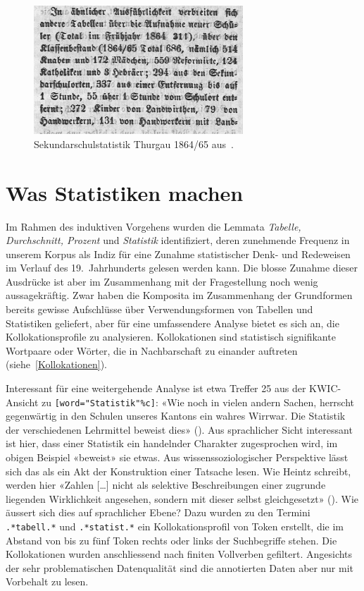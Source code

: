\begin{figure}[!ht]
    \centering
    \includegraphics[width=0.7\textwidth]{Figures/slz-002_1866_011_25_32_e6.jpg}
    \caption{Sekundarschulstatistik Thurgau 1864/65 aus~\cite[24]{noauthor_schulnachrichten_1866}.}
    \label{figure:5-3}
\end{figure}

\section{Was Statistiken machen}\label{chapter5-3}

Im Rahmen des induktiven Vorgehens wurden die Lemmata \textit{Tabelle, Durchschnitt, Prozent} und \textit{Statistik} identifiziert, deren zunehmende Frequenz in unserem Korpus als Indiz für eine Zunahme statistischer Denk- und Redeweisen im Verlauf des 19.~Jahrhunderts gelesen werden kann. Die blosse Zunahme dieser Ausdrücke ist aber im Zusammenhang mit der Fragestellung noch wenig aussagekräftig. Zwar haben die Komposita im Zusammenhang der Grundformen bereits gewisse Aufschlüsse über Verwendungsformen von Tabellen und Statistiken geliefert, aber für eine umfassendere Analyse bietet es sich an, die Kollokationsprofile zu analysieren. Kollokationen sind statistisch signifikante Wortpaare oder Wörter, die in Nachbarschaft zu einander auftreten (siehe~\ref{Kollokationen}).

Interessant für eine weitergehende Analyse ist etwa Treffer 25 aus der KWIC-Ansicht zu \texttt{[word=\-\string"Sta\-ti\-stik"\-\%c]}: «Wie noch in vielen andern Sachen, herrscht gegenwärtig in den Schulen unseres Kantons ein wahres Wirrwar. Die Statistik der verschiedenen Lehrmittel beweist dies» (\cite[14]{noauthor_korrespondenzen_1858}). Aus sprachlicher Sicht interessant ist hier, dass einer Statistik ein handelnder Charakter zugesprochen wird, im obigen Beispiel «beweist» sie etwas. Aus wissenssoziologischer Perspektive lässt sich das als ein Akt der Konstruktion einer Tatsache lesen. Wie Heintz schreibt, werden hier «Zahlen […] nicht als selektive Beschreibungen einer zugrunde liegenden Wirklichkeit angesehen, sondern mit dieser selbst gleichgesetzt» (\cite[74]{heintz_zahlen_2007}). Wie äussert sich dies auf sprachlicher Ebene? Dazu wurden zu den Termini \texttt{.*tabell.*} und \texttt{.*statist.*} ein Kollokationsprofil von Token erstellt, die im Abstand von bis zu fünf Token rechts oder links der Suchbegriffe stehen. Die Kollokationen wurden anschliessend nach finiten Vollverben gefiltert. Angesichts der sehr problematischen Datenqualität sind die annotierten Daten aber nur mit Vorbehalt zu lesen.

